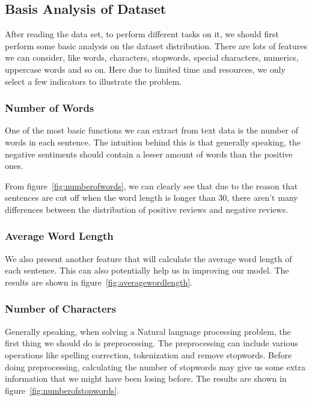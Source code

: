 \subsection{\textbf{Basis Analysis of Dataset}}

After reading the data set, to perform different tasks on it, we should first perform some basic analysis on the dataset distribution. There are lots of features we can consider, like words, characters, stopwords, special characters, numerics, uppercase words and so on. Here due to limited time and resources, we only select a few indicators to illustrate the problem.

\subsubsection{Number of Words}

One of the most basic functions we can extract from text data is the number of words in each sentence. The intuition behind this is that generally speaking, the negative sentiments should contain a lesser amount of words than the positive ones. 

From figure~\ref{fig:numberofwords}, we can clearly see that due to the reason that sentences are cut off when the word length is longer than 30, there aren't many differences between the distribution of positive reviews and negative reviews.

\subsubsection{Average Word Length}

We also present another feature that will calculate the average word length of each sentence. This can also potentially help us in improving our model. The results are shown in figure~\ref{fig:averagewordlength}.

\subsubsection{Number of Characters}

Generally speaking, when solving a Natural language processing problem, the first thing we should do is preprocessing. The preprocessing can include various operations like spelling correction, tokenization and remove stopwords. Before doing preprocessing, calculating the number of stopwords may give us some extra information that we might have been losing before. The results are shown in figure~\ref{fig:numberofstopwords}.


